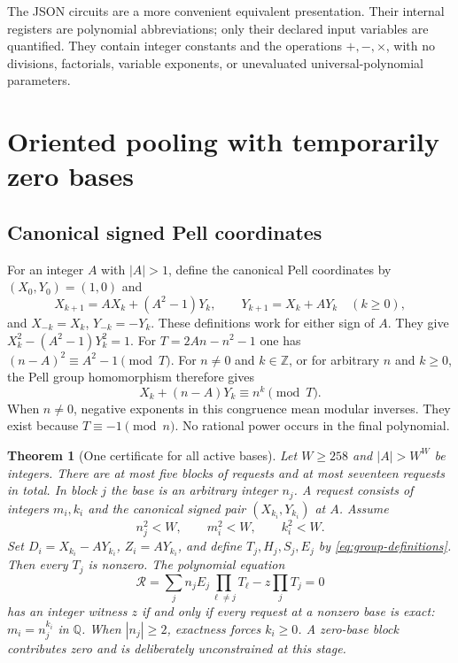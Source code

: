 \documentclass[11pt]{article}
\newtheorem{theorem}{Theorem}[section]
\theoremstyle{definition}\newtheorem{definition}[theorem]{Definition}
\theoremstyle{remark}\newtheorem{remark}[theorem]{Remark}
\newcommand{\Z}{\mathbb Z}
\newcommand{\Q}{\mathbb Q}
\begin{document}
The JSON circuits are a more convenient equivalent presentation. Their
internal registers are polynomial abbreviations; only their declared input
variables are quantified. They contain integer constants and the operations
$+,-,\times$, with no divisions, factorials, variable exponents, or
unevaluated universal-polynomial parameters.

\section{Oriented pooling with temporarily zero bases}
\label{sec:oriented}

\subsection{Canonical signed Pell coordinates}

For an integer $A$ with $|A|>1$, define the canonical Pell coordinates by
$(X_0,Y_0)=(1,0)$ and
\[
X_{k+1}=AX_k+(A^2-1)Y_k,\qquad
Y_{k+1}=X_k+AY_k
\quad(k\ge0),
\]
and $X_{-k}=X_k$, $Y_{-k}=-Y_k$. These definitions work for either sign
of $A$. They give $X_k^2-(A^2-1)Y_k^2=1$.
For $T=2An-n^2-1$ one has $(n-A)^2\equiv A^2-1\pmod T$.
For $n\ne0$ and $k\in\Z$, or for arbitrary $n$ and $k\ge0$,
the Pell group homomorphism therefore gives
\begin{equation}
X_k+(n-A)Y_k\equiv n^k\pmod T.\label{eq:pell-congruence}
\end{equation}
When $n\ne0$, negative exponents in this congruence mean modular
inverses. They exist because $T\equiv-1\pmod n$. No rational power
occurs in the final polynomial.

\begin{theorem}[One certificate for all active bases]
\label{thm:all-bases}
Let $W\ge258$ and $|A|>W^W$ be integers. There are at most five blocks
of requests and at most seventeen requests in total. In block $j$ the
base is an arbitrary integer $n_j$. A request consists of integers
$m_i,k_i$ and the canonical signed pair $(X_{k_i},Y_{k_i})$ at $A$.
Assume
\[
n_j^2<W,\qquad m_i^2<W,\qquad k_i^2<W.
\]
Set $D_i=X_{k_i}-AY_{k_i}$, $Z_i=AY_{k_i}$, and define
$T_j,H_j,S_j,E_j$ by \eqref{eq:group-definitions}. Then every $T_j$ is
nonzero. The polynomial equation
\begin{equation}
\mathcal R=
\sum_j n_jE_j\prod_{\ell\ne j}T_\ell
-z\prod_jT_j=0
\label{eq:oriented}
\end{equation}
has an integer witness $z$ if and only if every request at a nonzero
base is exact: $m_i=n_j^{k_i}$ in $\Q$. When $|n_j|\ge2$, exactness
forces $k_i\ge0$. A zero-base block contributes zero and is deliberately
unconstrained at this stage.
\end{theorem}
\end{document}
